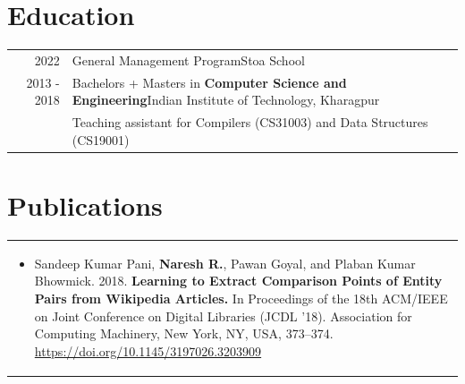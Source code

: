 \documentclass[a4paper,10pt]{extarticle} %
\begin{document}
\vspace{-1em}

\section{\textcolor{primary}{Education}}
\begin{tabularx}{\linewidth}{r|X}
\textsc{2022} & General Management Program\hfill Stoa School\hspace{0.3em}\raisebox{-.2\height}{}\\
\textsc{\hspace{0.3em}2013 - 2018} & Bachelors + Masters in \textbf{Computer Science and Engineering}\hspace{2.1em}Indian Institute of Technology, Kharagpur\hspace{0.3em}\raisebox{-.2\height}{}\\
&Teaching assistant for Compilers (CS31003) and Data Structures (CS19001)\\
\end{tabularx}


\section{\textcolor{primary}{Publications}}
\begin{tabularx}{\linewidth}{X}
\begin{itemize}[leftmargin=*, nosep, before=\vspace{-0.8\baselineskip}, after=\vspace{-1.8\baselineskip}]
    \item Sandeep Kumar Pani, \textbf{Naresh R.}, Pawan Goyal, and Plaban Kumar Bhowmick. 2018. \textbf{Learning to Extract Comparison Points of Entity Pairs from Wikipedia Articles.} In Proceedings of the 18th ACM/IEEE on Joint Conference on Digital Libraries (JCDL '18). Association for Computing Machinery, New York, NY, USA, 373–374. {\href{https://doi.org/10.1145/3197026.3203909}{https://doi.org/10.1145/3197026.3203909}}
\end{itemize}
\end{tabularx}
\end{document}
